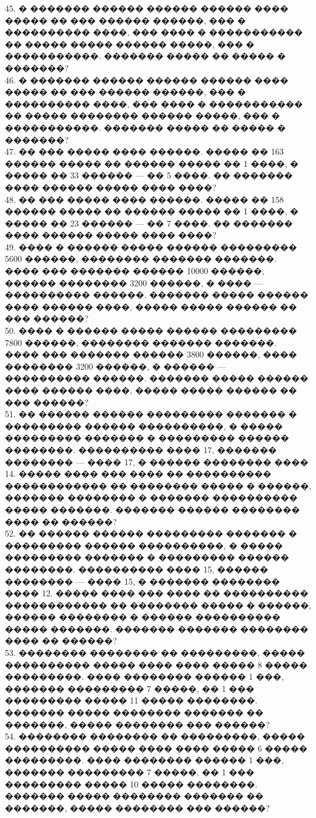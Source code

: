 \documentclass[12pt]{article}
\begin{document}
45. � ������� ������ ������ ������ ���� ����� �� ��� ������ ������, ��� � ���������� ����, ��� ���� � ����������� �� ����� ����� ������ �����, ��� � �����������. ������� ����� �� ����� � �������?\\
46. � ������� ������ ������ ������ ���� ����� �� ��� ������ ������, ��� � ���������� ����, ��� ���� � ����������� �� ����� �������� ������ �����, ��� � �����������. ������� ����� �� ����� � �������?\\
47. �� ��� ����� ���� ������. ����� �� 163 ������ ����� �� ������ ����� �� 1 ����, � ����� �� 33 ������ --- �� 5 ����. �� ������� ���� ������ ����� ���� ����?\\
48. �� ��� ����� ���� ������. ����� �� 158 ������ ����� �� ������ ����� �� 1 ����, � ����� �� 23 ������ --- �� 7 ����. �� ������� ���� ������ ����� ���� ����?\\
49. ���� � ������ ����� ������ ��������� 5600 ������, �������� ������� �������. ���� ��� ������� ������ 10000 ������, ������ �������� 3200 ������, � ���� --- ���������� ������. ������� ����� ������ ���� ������ ����, ����� ����� ������ �� ��� ������?\\
50. ���� � ������ ����� ������ ��������� 7800 ������, �������� ������� �������. ���� ��� ������� ������ 3800 ������, ���� �������� 3200 ������, � ������ --- ���������� ������. ������� ����� ������ ���� ������ ����, ����� ����� ������ �� ��� ������?\\
51. �� ������ ������ ��������� ������� � ��������� ������ ����������, � ����� ��������� ������� � ��������� ������ ��������. ���������� ���� 17, ������� �������� --- ���� 17, � ������ �������� ���� 14. ����� ���� ��� ���� �� ���������� ������������ �� �������� ����� � ������, ������� �������� � ������� ���������� ����� �������. ������� ������ �������� ���� �� ������?\\
52. �� ������ ������ ��������� ������� � ��������� ������ ����������, � ����� ��������� ������� � ��������� ������ ��������. ���������� ���� 15, ������ �������� --- ���� 15, � ������� �������� ���� 12. ����� ���� ��� ���� �� ���������� ������������ �� �������� ����� � ������, ������ �������� � ������ ���������� ����� �������. ������� ������� �������� ���� �� ������?\\
53. �������� �������� �� ���������, ����� ���������� ����� ���� ���� ����� 8 ����� ���������. ���� �������� ������ 1 ���, ������� ��������� 7 �����, �� 1 ��� ��������� ����� 11 ����� ��������. ������� ����� �������� ������� �� �������, ����� �������� ��� ������?\\
54. �������� �������� �� ���������, ����� ���������� ����� ���� ���� ����� 6 ����� ���������. ���� �������� ������ 1 ���, ������� ��������� 7 �����, �� 1 ��� ��������� ����� 10 ����� ��������. ������� ����� �������� ������� �� �������, ����� �������� ��� ������?\\
\end{document}
